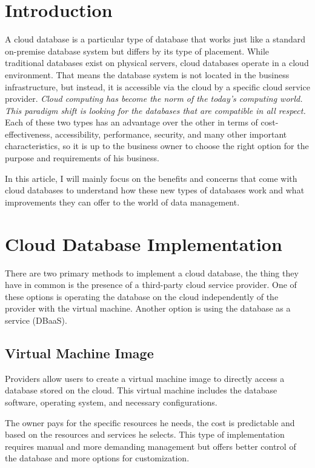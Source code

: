 \documentclass[12pt, a4paper]{article}
\begin{document}
\section{Introduction}
    A cloud database is a particular type of database that works just like a standard on-premise database system but differs by its type of placement. While traditional databases exist on physical servers, cloud databases operate in a cloud environment. That means the database system is not located in the business infrastructure, but instead, it is accessible via the cloud by a specific cloud service provider. \textit{Cloud computing has become the norm of the today's computing world. This paradigm shift is looking for the databases that are compatible in all respect.}\cite{03} Each of these two types has an advantage over the other in terms of cost-effectiveness, accessibility, performance, security, and many other important characteristics, so it is up to the business owner to choose the right option for the purpose and requirements of his business. \par In this article, I will mainly focus on the benefits and concerns that come with cloud databases to understand how these new types of databases work and what improvements they can offer to the world of data management.
\clearpage

\section{Cloud Database Implementation}
    There are two primary methods to implement a cloud database, the thing they have in common is the presence of a third-party cloud service provider. One of these options is operating the database on the cloud independently of the provider with the virtual machine. Another option is using the database as a service (DBaaS).
    
    \subsection{Virtual Machine Image}
        Providers allow users to create a virtual machine image to directly access a database stored on the cloud. This virtual machine includes the database software, operating system, and necessary configurations.\par The owner pays for the specific resources he needs, the cost is predictable and based on the resources and services he selects. This type of implementation requires manual and more demanding management but offers better control of the database and more options for customization.
    
\end{document}
